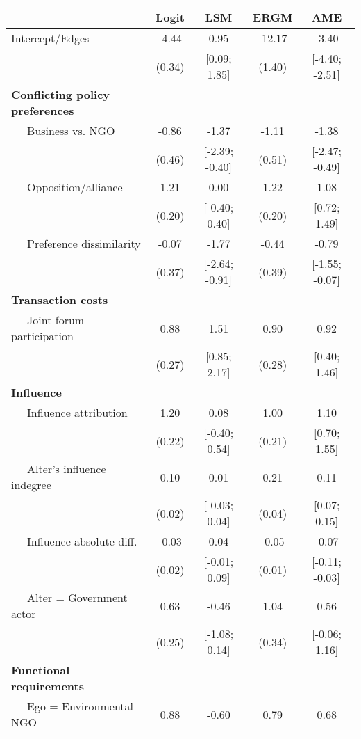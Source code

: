 \begin{table}[ht]
\centering
\begingroup\normalsize
\begin{tabular}{lcccc}
   & Logit & LSM & ERGM & AME \\ 
  \hline
\hline
Intercept/Edges & -4.44 & 0.95 & -12.17 & -3.40 \\ 
   & (0.34) & [0.09; 1.85] & (1.40) & [-4.40; -2.51] \\ 
  \textbf{Conflicting policy preferences} &  &  &  &  \\ 
  $\;\;\;\;$ Business vs. NGO & -0.86 & -1.37 & -1.11 & -1.38 \\ 
   & (0.46) & [-2.39; -0.40] & (0.51) & [-2.47; -0.49] \\ 
  $\;\;\;\;$ Opposition/alliance & 1.21 & 0.00 & 1.22 & 1.08 \\ 
   & (0.20) & [-0.40; 0.40] & (0.20) & [0.72; 1.49] \\ 
  $\;\;\;\;$ Preference dissimilarity & -0.07 & -1.77 & -0.44 & -0.79 \\ 
   & (0.37) & [-2.64; -0.91] & (0.39) & [-1.55; -0.07] \\ 
  \textbf{Transaction costs} &  &  &  &  \\ 
  $\;\;\;\;$ Joint forum participation & 0.88 & 1.51 & 0.90 & 0.92 \\ 
   & (0.27) & [0.85; 2.17] & (0.28) & [0.40; 1.46] \\ 
  \textbf{Influence} &  &  &  &  \\ 
  $\;\;\;\;$ Influence attribution & 1.20 & 0.08 & 1.00 & 1.10 \\ 
   & (0.22) & [-0.40; 0.54] & (0.21) & [0.70; 1.55] \\ 
  $\;\;\;\;$ Alter's influence indegree & 0.10 & 0.01 & 0.21 & 0.11 \\ 
   & (0.02) & [-0.03; 0.04] & (0.04) & [0.07; 0.15] \\ 
  $\;\;\;\;$ Influence absolute diff. & -0.03 & 0.04 & -0.05 & -0.07 \\ 
   & (0.02) & [-0.01; 0.09] & (0.01) & [-0.11; -0.03] \\ 
  $\;\;\;\;$ Alter = Government actor & 0.63 & -0.46 & 1.04 & 0.56 \\ 
   & (0.25) & [-1.08; 0.14] & (0.34) & [-0.06; 1.16] \\ 
  \textbf{Functional requirements} &  &  &  &  \\ 
  $\;\;\;\;$ Ego = Environmental NGO & 0.88 & -0.60 & 0.79 & 0.68 \\ 

\end{tabular}
\end{table}
